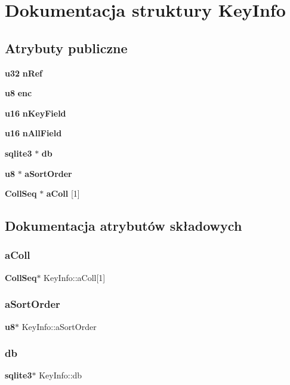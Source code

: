 \section{Dokumentacja struktury Key\+Info}
\label{struct_key_info}
\subsection*{Atrybuty publiczne}
\begin{DoxyCompactItemize}
\item 
\textbf{ u32} \textbf{ n\+Ref}
\item 
\textbf{ u8} \textbf{ enc}
\item 
\textbf{ u16} \textbf{ n\+Key\+Field}
\item 
\textbf{ u16} \textbf{ n\+All\+Field}
\item 
\textbf{ sqlite3} $\ast$ \textbf{ db}
\item 
\textbf{ u8} $\ast$ \textbf{ a\+Sort\+Order}
\item 
\textbf{ Coll\+Seq} $\ast$ \textbf{ a\+Coll} [1]
\end{DoxyCompactItemize}


\subsection{Dokumentacja atrybutów składowych}
\mbox{\label{struct_key_info_ad43aa024fca5a065e75d8e24b231adcb}} 
\subsubsection{aColl}
{\footnotesize\ttfamily \textbf{ Coll\+Seq}$\ast$ Key\+Info\+::a\+Coll[1]}

\mbox{\label{struct_key_info_ac5fe4bd0172a1f11f41f678528a7b21e}} 
\subsubsection{aSortOrder}
{\footnotesize\ttfamily \textbf{ u8}$\ast$ Key\+Info\+::a\+Sort\+Order}

\mbox{\label{struct_key_info_af2e7a3a411f5ca1ccf6de77d320b59db}} 
\subsubsection{db}
{\footnotesize\ttfamily \textbf{ sqlite3}$\ast$ Key\+Info\+::db}

